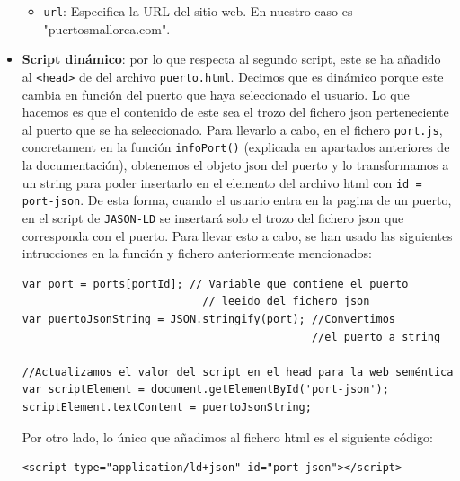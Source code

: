 \documentclass{article}
\begin{document}
\begin{itemize}
\begin{itemize}
       \item \texttt{url}: Especifica la URL del sitio web. En nuestro caso es "puertosmallorca.com".
    \end{itemize}
    \item \textbf{Script dinámico}: por lo que respecta al segundo script, este se ha añadido al \texttt{<head>} de del archivo \texttt{puerto.html}. Decimos que es dinámico porque este cambia en función del puerto que haya seleccionado el usuario. Lo que hacemos es que el contenido de este sea el trozo del fichero json perteneciente al puerto que se ha seleccionado. Para llevarlo a cabo, en el fichero \texttt{port.js}, concretament en la función \texttt{infoPort()} (explicada en apartados anteriores de la documentación), obtenemos el objeto json del puerto y lo transformamos a un string para poder insertarlo en el elemento del archivo html con \texttt{id = port-json}. De esta forma, cuando el usuario entra en la pagina de un puerto, en el script de \texttt{JASON-LD} se insertará solo el trozo del fichero json que corresponda con el puerto. Para llevar esto a cabo, se han usado las siguientes intrucciones en la función y fichero anteriormente mencionados:
    \begin{verbatim}
var port = ports[portId]; // Variable que contiene el puerto 
                            // leeido del fichero json
var puertoJsonString = JSON.stringify(port); //Convertimos 
                                             //el puerto a string

//Actualizamos el valor del script en el head para la web seméntica
var scriptElement = document.getElementById('port-json');
scriptElement.textContent = puertoJsonString;
    \end{verbatim}

    Por otro lado, lo único que añadimos al fichero html es el siguiente código:
    \begin{verbatim}
<script type="application/ld+json" id="port-json"></script>
    \end{verbatim}
\end{itemize}
\end{document}
